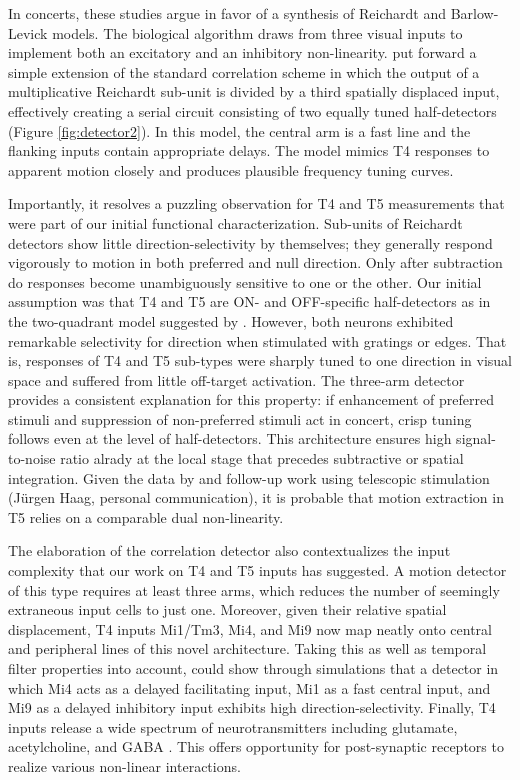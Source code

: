In concerts, these studies argue in favor of a synthesis of Reichardt and Barlow-Levick models. The biological algorithm draws from three visual inputs to implement both an excitatory and an inhibitory non-linearity. \citet{Haag:2016cq} put forward a simple extension of the standard correlation scheme in which the output of a multiplicative Reichardt sub-unit is divided by a third spatially displaced input, effectively creating a serial circuit consisting of two equally tuned half-detectors (Figure \ref{fig:detector2}). In this model, the central arm is a fast line and the flanking inputs contain appropriate delays. The model mimics T4 responses to apparent motion closely and produces plausible frequency tuning curves.

Importantly, it resolves a puzzling observation for T4 and T5 measurements that were part of our initial functional characterization. Sub-units of Reichardt detectors show little direction-selectivity by themselves; they generally respond vigorously to motion in both preferred and null direction. Only after subtraction do responses become unambiguously sensitive to one or the other. Our initial assumption was that T4 and T5 are ON- and OFF-specific half-detectors as in the two-quadrant model suggested by \citet{Eichner:2011ic}. However, both neurons exhibited remarkable selectivity for direction when stimulated with gratings or edges. That is, responses of T4 and T5 sub-types were sharply tuned to one direction in visual space and suffered from little off-target activation. The three-arm detector provides a consistent explanation for this property: if enhancement of preferred stimuli and suppression of non-preferred stimuli act in concert, crisp tuning follows even at the level of half-detectors. This architecture ensures high signal-to-noise ratio alrady at the local stage that precedes subtractive or spatial integration. Given the data by \citet{Leong:2016hu} and follow-up work using telescopic stimulation (Jürgen Haag, personal communication), it is probable that motion extraction in T5 relies on a comparable dual non-linearity.

The elaboration of the correlation detector also contextualizes the input complexity that our work on T4 and T5 inputs has suggested. A motion detector of this type requires at least three arms, which reduces the number of seemingly extraneous input cells to just one. Moreover, given their relative spatial displacement, T4 inputs Mi1/Tm3, Mi4, and Mi9 now map neatly onto central and peripheral lines of this novel architecture. Taking this as well as temporal filter properties into account, \citet{Arenz:2017aa} could show through simulations that a detector in which Mi4 acts as a delayed facilitating input, Mi1 as a fast central input, and Mi9 as a delayed inhibitory input exhibits high direction-selectivity. Finally, T4 inputs release a wide spectrum of neurotransmitters including glutamate, acetylcholine, and GABA \citep{Takemura:2017aa}. This offers opportunity for post-synaptic receptors to realize various non-linear interactions.

